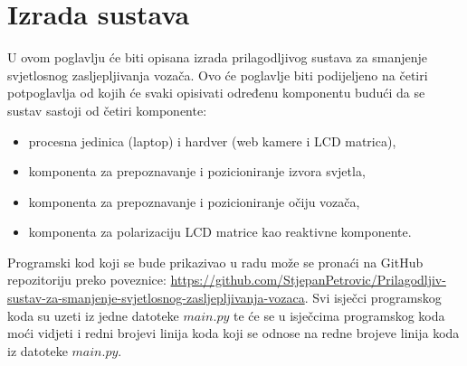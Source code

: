 \documentclass{foi}
\begin{document}
\chapter{Izrada sustava}

U ovom poglavlju će biti opisana izrada prilagodljivog sustava za smanjenje svjetlosnog zasljepljivanja vozača. Ovo će poglavlje biti podijeljeno na četiri potpoglavlja od kojih će svaki opisivati određenu komponentu budući da se sustav sastoji od četiri komponente:
\begin{itemize}[noitemsep]
    \item procesna jedinica (laptop) i hardver (web kamere i LCD matrica),
    \item komponenta za prepoznavanje i pozicioniranje izvora svjetla,
    \item komponenta za prepoznavanje i pozicioniranje očiju vozača,
    \item komponenta za polarizaciju LCD matrice kao reaktivne komponente.
\end{itemize}

Programski kod koji se bude prikazivao u radu može se pronaći na GitHub repozitoriju preko poveznice: \href{https://github.com/StjepanPetrovic/Prilagodljiv-sustav-za-smanjenje-svjetlosnog-zasljepljivanja-vozaca}{https://github.com/StjepanPetrovic/Prilagodljiv-sustav-za-smanjenje-svjetlosnog-zasljepljivanja-vozaca}. Svi isječci programskog koda su uzeti iz jedne datoteke \href{https://github.com/StjepanPetrovic/Prilagodljiv-sustav-za-smanjenje-svjetlosnog-zasljepljivanja-vozaca/blob/main/development/main.py}{$main.py$} te će se u isječcima programskog koda moći vidjeti i redni brojevi linija koda koji se odnose na redne brojeve linija koda iz datoteke \href{https://github.com/StjepanPetrovic/Prilagodljiv-sustav-za-smanjenje-svjetlosnog-zasljepljivanja-vozaca/blob/main/development/main.py}{$main.py$}.
\end{document}
